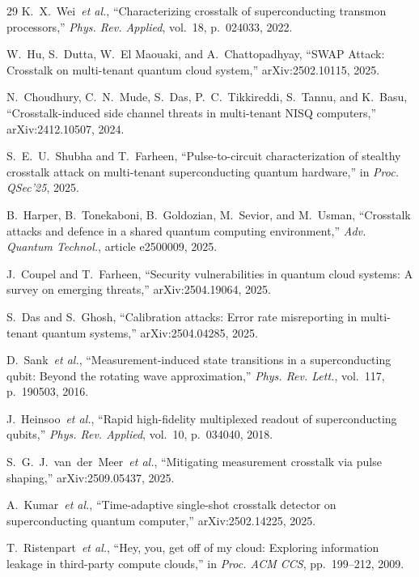 \documentclass[ASNA,twocolumn]{USG}
\begin{document}
\begin{thebibliography}{29}
K.~X.~Wei~\emph{et al.}, ``Characterizing crosstalk of superconducting transmon processors,'' \emph{Phys. Rev. Applied}, vol.~18, p.~024033, 2022.

W.~Hu, S.~Dutta, W.~El Maouaki, and A.~Chattopadhyay, ``SWAP Attack: Crosstalk on multi-tenant quantum cloud system,'' arXiv:2502.10115, 2025.

N.~Choudhury, C.~N.~Mude, S.~Das, P.~C.~Tikkireddi, S.~Tannu, and K.~Basu, ``Crosstalk-induced side channel threats in multi-tenant NISQ computers,'' arXiv:2412.10507, 2024.

S.~E.~U.~Shubha and T.~Farheen, ``Pulse-to-circuit characterization of stealthy crosstalk attack on multi-tenant superconducting quantum hardware,'' in \emph{Proc. QSec'25}, 2025.

B.~Harper, B.~Tonekaboni, B.~Goldozian, M.~Sevior, and M.~Usman, ``Crosstalk attacks and defence in a shared quantum computing environment,'' \emph{Adv. Quantum Technol.}, article e2500009, 2025.

J.~Coupel and T.~Farheen, ``Security vulnerabilities in quantum cloud systems: A survey on emerging threats,'' arXiv:2504.19064, 2025.

S.~Das and S.~Ghosh, ``Calibration attacks: Error rate misreporting in multi-tenant quantum systems,'' arXiv:2504.04285, 2025.

D.~Sank~\emph{et al.}, ``Measurement-induced state transitions in a superconducting qubit: Beyond the rotating wave approximation,'' \emph{Phys. Rev. Lett.}, vol.~117, p.~190503, 2016.

J.~Heinsoo~\emph{et al.}, ``Rapid high-fidelity multiplexed readout of superconducting qubits,'' \emph{Phys. Rev. Applied}, vol.~10, p.~034040, 2018.

S.~G.~J.~van~der~Meer~\emph{et al.}, ``Mitigating measurement crosstalk via pulse shaping,'' arXiv:2509.05437, 2025.

A.~Kumar~\emph{et al.}, ``Time-adaptive single-shot crosstalk detector on superconducting quantum computer,'' arXiv:2502.14225, 2025.

T.~Ristenpart~\emph{et al.}, ``Hey, you, get off of my cloud: Exploring information leakage in third-party compute clouds,'' in \emph{Proc. ACM CCS}, pp.~199--212, 2009.


\end{thebibliography}
\end{document}
